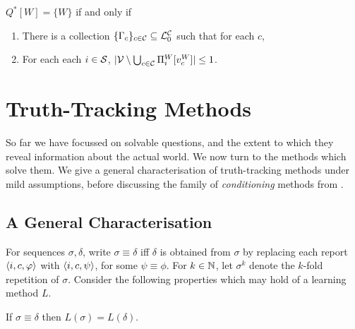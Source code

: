 \begin{corollary}
    \label{cor_qstar_unique_world}
    $Q^*[W] = \{W\}$ if and only if
    \begin{enumerate}
        \item There is a collection $\{\Gamma_c\}_{c \in \mathcal{C}} \subseteq
              \mathcal{L}_0^{\mathcal{C}}$ such that for each $c$,
        \item For each each $i \in \mathcal{S}$, $|\mathcal{V} \setminus \bigcup_{c \in
            \mathcal{C}}{\Pi^W_i[v^W_c]}| \le 1$.
    \end{enumerate}
\end{corollary}

\section{Truth-Tracking Methods}
\label{sec_methods}

So far we have focussed on solvable questions, and the extent to which they
reveal information about the actual world. We now turn to the methods which
solve them. We give a general characterisation of truth-tracking methods under
mild assumptions, before discussing the family of \emph{conditioning} methods
from \textcite{singleton_booth_22_preprint}.

\subsection{A General Characterisation}

For sequences $\sigma, \delta$, write $\sigma \equiv \delta$ iff $\delta$ is
obtained from $\sigma$ by replacing each report $\langle {i, c, \varphi} \rangle$ with
$\langle {i, c, \psi} \rangle$, for some $\psi \equiv \phi$. For $k \in \mathbb{N}$, let
$\sigma^k$ denote the $k$-fold repetition of $\sigma$.
%
Consider the following properties which may hold of a learning method $L$.

\begin{axiom}[\equivalence{}]
    If $\sigma \equiv \delta$ then $L(\sigma) = L(\delta)$.
\end{axiom}

